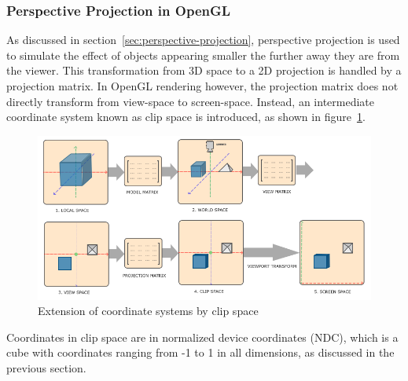 \subsubsection{Perspective Projection in OpenGL}

As discussed in section~\ref{sec:perspective-projection}, perspective projection is used
to simulate the effect of objects appearing smaller the further away they are from the viewer.
This transformation from 3D space to a 2D projection is handled by a projection matrix.
In OpenGL rendering however, the projection matrix does not directly transform from view-space to screen-space.
Instead, an intermediate coordinate system known as clip space is introduced, as shown in figure~\ref{fig:coordinate-systems-with-clip-space}.
\begin{figure}[h!]
    \centering
    \includegraphics[width=0.85\linewidth]{images/coordinate_systems}
    \caption{Extension of coordinate systems by clip space}
    \label{fig:coordinate-systems-with-clip-space}
\end{figure}
Coordinates in clip space are in normalized device coordinates (NDC), which is a cube
with coordinates ranging from -1 to 1 in all dimensions, as discussed in the previous section.


